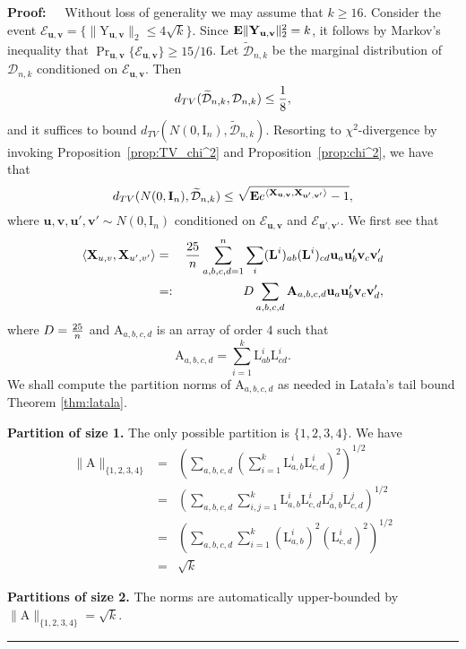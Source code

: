 \documentclass[11pt]{article}
\newenvironment{proof}{\begin{trivlist} \item {\bf Proof:~~}}
  {\qed\end{trivlist}}
\newcommand{\mat}[1]{{\ensuremath{\bm{\mathrm{#1}}}}}
\def\u{{\mathbf u}}
\def\ve{{\mathbf v}}
\def\matA{\mat{A}}
\def\matI{\mat{I}}
\def\matL{\mat{L}}
\def\matX{\mat{X}}
\def\matY{\mat{Y}}
\def\frac#1#2{{#1\over #2}}
\def\qed{\hfill\rule{2mm}{2mm}}
\begin{document}
\begin{proof}
Without loss of generality we may assume that $k\geq 16$. 
Consider the event $\mathcal{E}_{\u,\ve} = \{\|\matY_{\u,\ve}\|_2\leq 4\sqrt{k}\}$. 
Since ${\bf E}\|\matY_{\u,\ve}\|_2^2 = k$, it follows by Markov's inequality that 
$\Pr_{\u,\ve}\{\mathcal{E}_{\u,\ve}\}\geq 15/16$. 
Let $\widetilde{\mathcal{D}}_{n,k}$ be the marginal distribution of $\mathcal{D}_{n,k}$ conditioned on $\mathcal{E}_{\u,\ve}$. Then
\[
d_{TV}(\widetilde{\mathcal{D}}_{n,k},\mathcal{D}_{n,k})\leq \frac{1}{8},
\]
and it suffices to bound $d_{TV}(N(0,\matI_n),\widetilde{\mathcal{D}}_{n,k})$. 
Resorting to $\chi^2$-divergence by invoking Proposition~\ref{prop:TV_chi^2} and Proposition~\ref{prop:chi^2}, we have that
\[
d_{TV}(N(0,\matI_n),\widetilde{\mathcal{D}}_{n,k})\leq \sqrt{{\bf E} e^{\langle \matX_{\u,\ve},\matX_{\u',\ve'}\rangle}-1},
\]
where $\u,\ve,\u',\ve'\sim N(0,\matI_n)$ conditioned on $\mathcal{E}_{\u,\ve}$ and $\mathcal{E}_{\u',\ve'}$. We first see that 
\begin{eqnarray*}
\langle \matX_{u,v}, \matX_{u', v'}\rangle & = & \frac{25}{n}\sum_{a,b,c,d=1}^n\sum_i (\matL^i)_{ab}(\matL^i)_{cd} \u_a \u'_b \ve_c \ve'_d \\
& =: & D\sum_{a,b,c,d} \matA_{a,b,c,d} \u_a \u'_b \ve_c \ve'_d,
\end{eqnarray*}
where $D = \frac{25}{n}$ and $\matA_{a,b,c,d}$ is an array of order $4$ such that
\[
\matA_{a,b,c,d} = \sum_{i=1}^k \matL^i_{ab} \matL^i_{cd}.
\]
We shall compute the partition norms of $\matA_{a,b,c,d}$ as needed in Lata{\l}a's tail bound Theorem \ref{thm:latala}. 

\noindent\textbf{Partition of size 1.}
The only possible partition is $\{1,2,3,4\}$. We have
\begin{align*}
\|\matA\|_{\{1,2,3,4\}} & = & \left(\sum_{a,b,c,d} \left(\sum_{i=1}^k \matL^i_{a,b}\matL^i_{c,d}\right)^2\right)^{1/2}\\
&=&
\left(\sum_{a,b,c,d} \sum_{i,j=1}^k \matL^i_{a,b}\matL^i_{c,d}\matL^j_{a,b}\matL^j_{c,d}\right)^{1/2}\\
&=&\left(\sum_{a,b,c,d} \sum_{i=1}^k (\matL^i_{a,b})^2 (\matL^i_{c,d})^2\right)^{1/2}\\
&=&\sqrt{k}
\end{align*}

\noindent\textbf{Partitions of size 2.} The norms are automatically upper-bounded by $\|\matA\|_{\{1,2,3,4\}} = \sqrt{k}$.


\end{proof}
\end{document}
